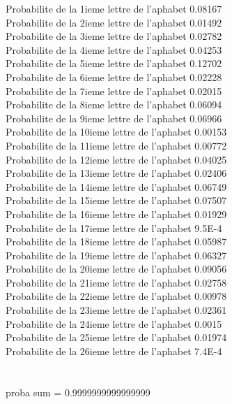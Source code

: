 \documentclass{article}
\begin{document}
Probabilite de la 1ieme lettre de l'aphabet 0.08167\\
Probabilite de la 2ieme lettre de l'aphabet 0.01492\\
Probabilite de la 3ieme lettre de l'aphabet 0.02782\\
Probabilite de la 4ieme lettre de l'aphabet 0.04253\\
Probabilite de la 5ieme lettre de l'aphabet 0.12702\\
Probabilite de la 6ieme lettre de l'aphabet 0.02228\\
Probabilite de la 7ieme lettre de l'aphabet 0.02015\\
Probabilite de la 8ieme lettre de l'aphabet 0.06094\\
Probabilite de la 9ieme lettre de l'aphabet 0.06966\\
Probabilite de la 10ieme lettre de l'aphabet 0.00153\\
Probabilite de la 11ieme lettre de l'aphabet 0.00772\\
Probabilite de la 12ieme lettre de l'aphabet 0.04025\\
Probabilite de la 13ieme lettre de l'aphabet 0.02406\\
Probabilite de la 14ieme lettre de l'aphabet 0.06749\\
Probabilite de la 15ieme lettre de l'aphabet 0.07507\\
Probabilite de la 16ieme lettre de l'aphabet 0.01929\\
Probabilite de la 17ieme lettre de l'aphabet 9.5E-4\\
Probabilite de la 18ieme lettre de l'aphabet 0.05987\\
Probabilite de la 19ieme lettre de l'aphabet 0.06327\\
Probabilite de la 20ieme lettre de l'aphabet 0.09056\\
Probabilite de la 21ieme lettre de l'aphabet 0.02758\\
Probabilite de la 22ieme lettre de l'aphabet 0.00978\\
Probabilite de la 23ieme lettre de l'aphabet 0.02361\\
Probabilite de la 24ieme lettre de l'aphabet 0.0015\\
Probabilite de la 25ieme lettre de l'aphabet 0.01974\\
Probabilite de la 26ieme lettre de l'aphabet 7.4E-4\\
\\
\\
proba sum = 0.9999999999999999\\
\end{document}
